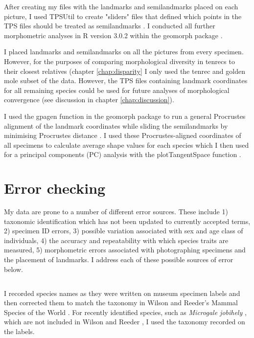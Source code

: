 	After creating my files with the landmarks and semilandmarks placed on each picture, I used TPSUtil \citep{Rohlf2012} to create "sliders" files that defined which points in the TPS files should be treated as semilandmarks \citep{Zelditch2012}. I conducted all further morphometric analyses in R version 3.0.2 \citep{Team2014} within the geomorph package \citep{Adams2013}.
	
	I placed landmarks and semilandmarks on all the pictures from every specimen. However, for the purposes of comparing morphological diversity in tenrecs to their closest relatives (chapter \ref{chap:disparity} I only used the tenrec and golden mole subset of the data. However, the TPS files containing landmark coordinates for all remaining species could be used for future analyses of morphological convergence (see discussion in chapter \ref{chap:discussion}). 
	
	I used the gpagen function in the geomorph package \citep{Adams2013} to run a general Procrustes alignment \citep{Rohlf1993} of the landmark coordinates while sliding the semilandmarks by minimising Procrustes distance \citep{Bookstein1997}.
	I used these Procrustes-aligned coordinates of all specimens to calculate average shape values for each species which I then used for a principal components (PC) analysis with the plotTangentSpace function \citep{Adams2013}. 
	



\section{Error checking}
\label{sect:errors}
	My data are prone to a number of different error sources. These include 1) taxonomic identification which has not been updated to currently accepted terms, 2) specimen ID errors, 3) possible variation associated with sex and age class of individuals, 4) the accuracy and repeatability with which species traits are measured, 5) morphometric errors associated with photographing specimens and the placement of landmarks. I address each of these possible sources of error below.  

\subsection{}
	I recorded species names as they were written on museum specimen labels and then corrected them to match the taxonomy in Wilson and Reeder's Mammal Species of the World \citeyearpar{Wilson2005}. For recently identified species, such as \textit{Microgale jobihely} \citep{Goodman2006}, which are not included in Wilson and Reeder \citeyearpar{Wilson2005}, I used the taxonomy recorded on the labels. 

